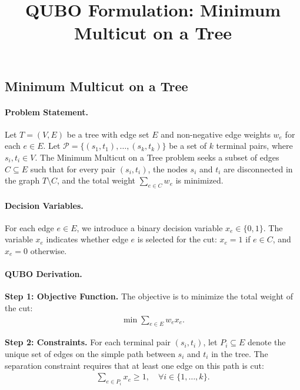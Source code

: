 \documentclass[12pt]{article}
\title{QUBO Formulation: Minimum Multicut on a Tree}
\date{}
\begin{document}
\maketitle

\subsection*{Minimum Multicut on a Tree}

\paragraph{Problem Statement.}
Let $T=(V,E)$ be a tree with edge set $E$ and non-negative edge weights $w_e$ for each $e \in E$. Let $\mathcal{P} = \{(s_1, t_1), \dots, (s_k, t_k)\}$ be a set of $k$ terminal pairs, where $s_i, t_i \in V$. The Minimum Multicut on a Tree problem seeks a subset of edges $C \subseteq E$ such that for every pair $(s_i, t_i)$, the nodes $s_i$ and $t_i$ are disconnected in the graph $T \setminus C$, and the total weight $\sum_{e \in C} w_e$ is minimized.

\paragraph{Decision Variables.}
For each edge $e \in E$, we introduce a binary decision variable $x_e \in \{0,1\}$. The variable $x_e$ indicates whether edge $e$ is selected for the cut: $x_e = 1$ if $e \in C$, and $x_e = 0$ otherwise.

\paragraph{QUBO Derivation.}
\textbf{Step 1: Objective Function.}
The objective is to minimize the total weight of the cut:
\begin{align}
    \min \sum_{e \in E} w_e x_e.
\end{align}

\textbf{Step 2: Constraints.}
For each terminal pair $(s_i, t_i)$, let $P_i \subseteq E$ denote the unique set of edges on the simple path between $s_i$ and $t_i$ in the tree. The separation constraint requires that at least one edge on this path is cut:
\begin{align}
    \sum_{e \in P_i} x_e \ge 1, \quad \forall i \in \{1, \dots, k\}.
\end{align}
\end{document}
